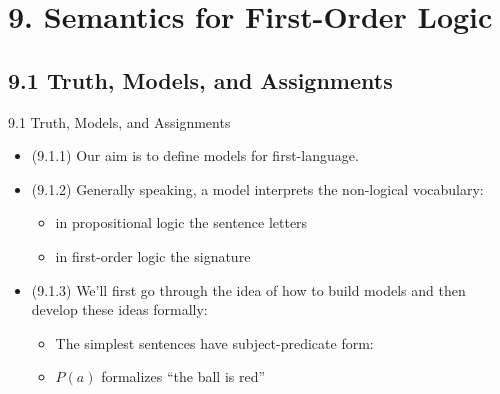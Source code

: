 \section{9. Semantics for First-Order Logic}
\subsection{9.1 Truth, Models, and Assignments}

\begin{frame}{9.1 Truth, Models, and Assignments}

	\begin{itemize}
		
		\item (9.1.1) Our aim is to define models for first-language.
		
		\item (9.1.2) Generally speaking, a model interprets the non-logical vocabulary:
		
		\begin{itemize}
			
			\item in propositional logic the sentence letters
			
			\item in first-order logic the signature
		
		\end{itemize}
		
		\item (9.1.3) We'll first go through the idea of how to build models and then develop these ideas formally:
		
		\begin{itemize}
		
			\item The simplest sentences have subject-predicate form:
			
			\item $P(a)$ formalizes ``the ball is red''
		
		\end{itemize}
		
	\end{itemize}

\end{frame}

